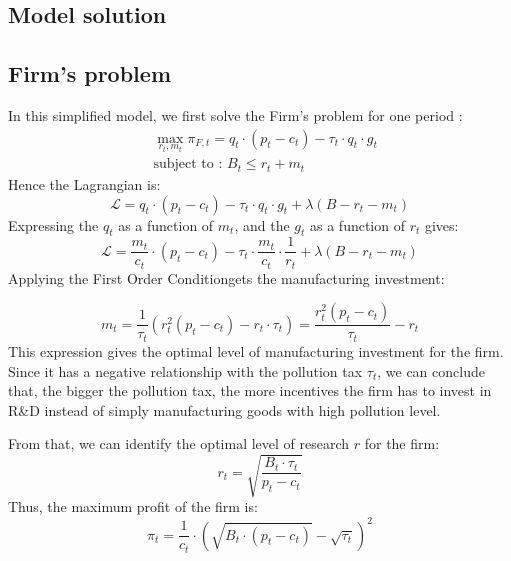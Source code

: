 \documentclass{article}
\begin{document}
\subsection{Model solution}

\subsection{Firm's problem}
In this simplified model, we first solve the Firm's problem for one period : 
\begin{equation*}
    \begin{split}
    & \max_{r_{t},m_{t}}{\pi_{F,t}=q_{t}\cdot\left(p_{t}-c_{t}\right)-\tau_{t}\cdot q_{t}\cdot g_{t}} \\ 
    & \text{subject to : } B_{t} \leq r_{t} + m_{t}
    \end{split}
\end{equation*}
Hence the Lagrangian is: 
\begin{equation*}
    \mathcal{L} = q_{t}\cdot\left(p_{t}-c_{t}\right)-\tau_{t}\cdot q_{t}\cdot g_{t}+\lambda\left(B-r_{t}-m_{t}\right)
\end{equation*}
Expressing the $q_{t}$ as a function of $m_{t}$, and the $g_{t}$ as a function of $r_{t}$ gives: 
\begin{equation*}
    \mathcal{L} = \frac{m_{t}}{c_{t}}\cdot\left(p_{t}-c_{t}\right)-\tau_{t}\cdot \frac{m_{t}}{c_{t}}\cdot \frac{1}{r_{t}}+\lambda\left(B-r_{t}-m_{t}\right)
\end{equation*}
Applying the First Order Condition\footnotemark[3] gets the manufacturing investment:

\begin{equation}
    m_{t}=\frac{1}{\tau_{t}}\left(r_{t}^{2}(p_{t}-c_{t})-r_{t}\cdot \tau_{t}\right)=\frac{r_{t}^{2}\left(p_{t}-c_{t}\right)}{\tau_{t}}-r_{t}
\end{equation}
This expression gives the optimal level of manufacturing investment for the firm. Since it has a negative relationship with the pollution tax $\tau_{t}$, we can conclude that, the bigger the pollution tax, the more incentives the firm has to invest in R\&D instead of simply manufacturing goods with high pollution level. 

From that, we can identify the optimal level of research $r$ for the firm\footnotemark[4] :
\begin{equation}
    r_{t}=\sqrt{\frac{B_{t}\cdot \tau_{t}}{p_{t}-c_{t}}}
\end{equation}
Thus, the maximum profit of the firm is\footnotemark[5] : 
\begin{equation}
    \pi_{t}=\frac{1}{c_{t}}\cdot\left({\sqrt{B_{t}\cdot (p_{t}-c_{t})}-\sqrt{\tau_{t}}}\right)^{2}
\end{equation}
\end{document}
